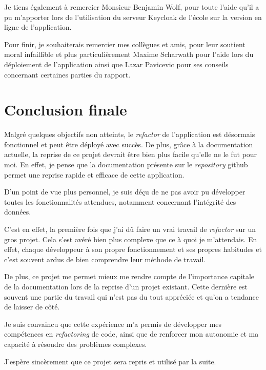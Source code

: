 Je tiens également à remercier Monsieur Benjamin Wolf, pour toute l'aide qu'il a pu m'apporter lors de l'utilisation du serveur Keycloak de l'école sur la version en ligne de l'application.

Pour finir, je souhaiterais remercier mes collègues et amis, pour leur soutient moral infaillible et plus particulièrement Maxime Scharwath pour l'aide lors du déploiement de l'application ainsi que Lazar Pavicevic pour ses conseils concernant certaines parties du rapport.

\section{Conclusion finale}
Malgré quelques objectifs non atteints, le \emph{refactor} de l'application est désormais fonctionnel et peut être déployé avec succès. De plus, grâce à la documentation actuelle, la reprise de ce projet devrait être bien plus facile qu'elle ne le fut pour moi. En effet, je pense que la documentation présente sur le \emph{repository} github permet une reprise rapide et efficace de cette application.

D'un point de vue plus personnel, je suis déçu de ne pas avoir pu développer toutes les fonctionnalités attendues, notamment concernant l'intégrité des données.

C'est en effet, la première fois que j'ai dû faire un vrai travail de \emph{refactor} sur un gros projet. Cela s'est avéré bien plus complexe que ce à quoi je m'attendais. En effet, chaque développeur à son propre fonctionnement et ses propres habitudes et c'est souvent ardus de bien comprendre leur méthode de travail.

De plus, ce projet me permet mieux me rendre compte de l'importance capitale de la documentation lors de la reprise d'un projet existant. Cette dernière est souvent une partie du travail qui n'est pas du tout appréciée et qu'on a tendance de laisser de côté.

Je suis convaincu que cette expérience m'a permis de développer mes compétences en \emph{refactoring} de code, ainsi que de renforcer mon autonomie et ma capacité à résoudre des problèmes complexes.

J'espère sincèrement que ce projet sera repris et utilisé par la suite.

\vfil
\hspace{8cm}\makeatletter\@author\makeatother\par
\hspace{8cm}\begin{minipage}{5cm}
    \printsignature
\end{minipage}